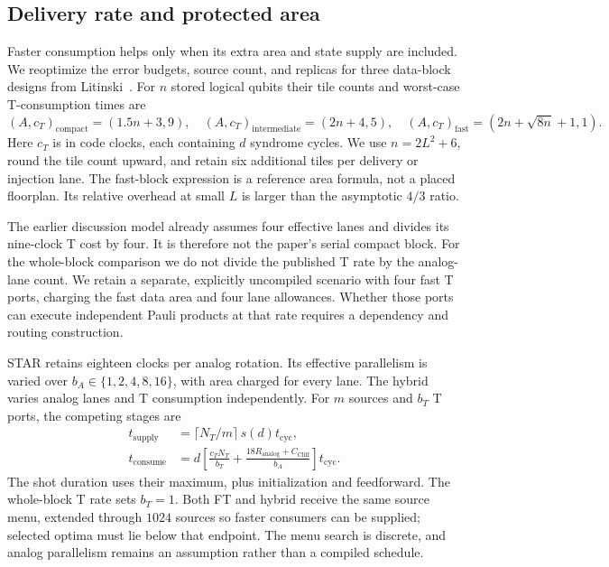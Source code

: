 \documentclass[11pt]{article}
\begin{document}
\subsection{Delivery rate and protected area}\label{sec:delivery}
Faster consumption helps only when its extra area and state supply are
included. We reoptimize the error budgets, source count, and replicas for
three data-block designs from Litinski~\cite{litinski}. For $n$ stored
logical qubits their tile counts and worst-case T-consumption times are
\begin{equation}
 (A,c_T)_{\mathrm{compact}}=(1.5n+3,9),\quad
 (A,c_T)_{\mathrm{intermediate}}=(2n+4,5),\quad
 (A,c_T)_{\mathrm{fast}}=(2n+\sqrt{8n}+1,1).
\end{equation}
Here $c_T$ is in code clocks, each containing $d$ syndrome cycles. We use
$n=2L^2+6$, round the tile count upward, and retain six additional tiles
per delivery or injection lane. The fast-block expression is a reference
area formula, not a placed floorplan. Its relative overhead at small $L$
is larger than the asymptotic $4/3$ ratio.

The earlier discussion model already assumes four effective lanes and
divides its nine-clock T cost by four. It is therefore not the paper's
serial compact block. For the whole-block comparison we do not divide the
published T rate by the analog-lane count. We retain a separate, explicitly
uncompiled scenario with four fast T ports, charging the fast data area and
four lane allowances. Whether those ports can execute independent Pauli
products at that rate requires a dependency and routing construction.

STAR retains eighteen clocks per analog rotation. Its effective parallelism
is varied over $b_A\in\{1,2,4,8,16\}$, with area charged for every lane.
The hybrid varies analog lanes and T consumption independently. For $m$
sources and $b_T$ T ports, the competing stages are
\begin{align}
 t_{\mathrm{supply}}&=\lceil N_T/m\rceil\,s(d)t_{\mathrm{cyc}},\\
 t_{\mathrm{consume}}&=d\left[\frac{c_TN_T}{b_T}
       +\frac{18R_{\mathrm{analog}}+C_{\mathrm{Cliff}}}{b_A}\right]
       t_{\mathrm{cyc}}.
\end{align}
The shot duration uses their maximum, plus initialization and feedforward.
The whole-block T rate sets $b_T=1$. Both FT and hybrid receive the same
source menu, extended through $1024$ sources so faster consumers can be
supplied; selected optima must lie below that endpoint. The menu search is
discrete, and analog parallelism remains an assumption rather than a
compiled schedule.
\end{document}
